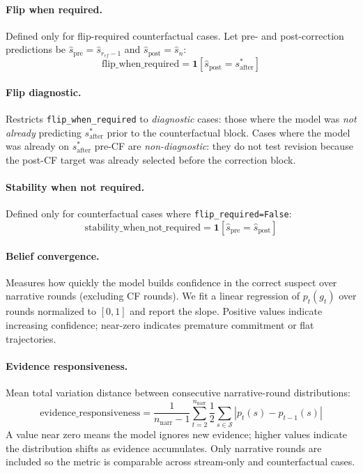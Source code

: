 \documentclass{article}
\begin{document}
\paragraph{Flip when required.}
Defined only for flip-required counterfactual cases. Let pre- and post-correction predictions be \(\hat{s}_{\text{pre}} = \hat{s}_{r_{cf}-1}\) and \(\hat{s}_{\text{post}} = \hat{s}_n\):
\[
\text{flip\_when\_required} = \mathbf{1}\!\left[\hat{s}_{\text{post}} = s^*_{\text{after}}\right]
\]

\paragraph{Flip diagnostic.}
Restricts \texttt{flip\_when\_required} to \emph{diagnostic} cases: those where the model was \emph{not already} predicting \(s^*_{\text{after}}\) prior to the counterfactual block. Cases where the model was already on \(s^*_{\text{after}}\) pre-CF are \emph{non-diagnostic}: they do not test revision because the post-CF target was already selected before the correction block.

\paragraph{Stability when not required.}
Defined only for counterfactual cases where \texttt{flip\_required=False}:
\[
\text{stability\_when\_not\_required} = \mathbf{1}\!\left[\hat{s}_{\text{pre}} = \hat{s}_{\text{post}}\right]
\]

\paragraph{Belief convergence.}
Measures how quickly the model builds confidence in the correct suspect over narrative rounds (excluding CF rounds). We fit a linear regression of \(p_t(g_t)\) over rounds normalized to \([0,1]\) and report the slope. Positive values indicate increasing confidence; near-zero indicates premature commitment or flat trajectories.

\paragraph{Evidence responsiveness.}
Mean total variation distance between consecutive narrative-round distributions:
\[
\text{evidence\_responsiveness} = \frac{1}{n_{\text{narr}}-1}\sum_{t=2}^{n_{\text{narr}}} \frac{1}{2}\sum_{s \in \mathcal{S}} |p_t(s) - p_{t-1}(s)|
\]
A value near zero means the model ignores new evidence; higher values indicate the distribution shifts as evidence accumulates. Only narrative rounds are included so the metric is comparable across stream-only and counterfactual cases.
\end{document}
